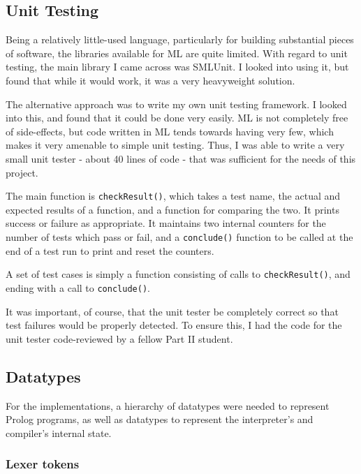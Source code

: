 \documentclass[12pt]{article}
\begin{document}
\subsection{Unit Testing}

Being a relatively little-used language, particularly for building substantial pieces of software, the libraries available for ML are quite limited. 
With regard to unit testing, the main library I came across was SMLUnit. 
I looked into using it, but found that while it would work, it was a very heavyweight solution.

The alternative approach was to write my own unit testing framework. 
I looked into this, and found that it could be done very easily. 
ML is not completely free of side-effects, but code written in ML tends towards having very few, which makes it very amenable to simple unit testing. 
Thus, I was able to write a very small unit tester - about 40 lines of code - that was sufficient for the needs of this project.

The main function is \verb|checkResult()|, which takes a test name, the actual and expected results of a function, and a function for comparing the two. 
It prints success or failure as appropriate. 
It maintains two internal counters for the number of tests which pass or fail, and a \verb|conclude()| function to be called at the end of a test run to print and reset the counters.

A set of test cases is simply a function consisting of calls to \verb|checkResult()|, and ending with a call to \verb|conclude()|.

It was important, of course, that the unit tester be completely correct so that test failures would be properly detected. 
To ensure this, I had the code for the unit tester code-reviewed by a fellow Part II student.

\subsection{Datatypes}


For the implementations, a hierarchy of datatypes were needed to represent Prolog programs, as well as datatypes to represent the interpreter's and compiler's internal state. 

\subsubsection{Lexer tokens}
\end{document}
